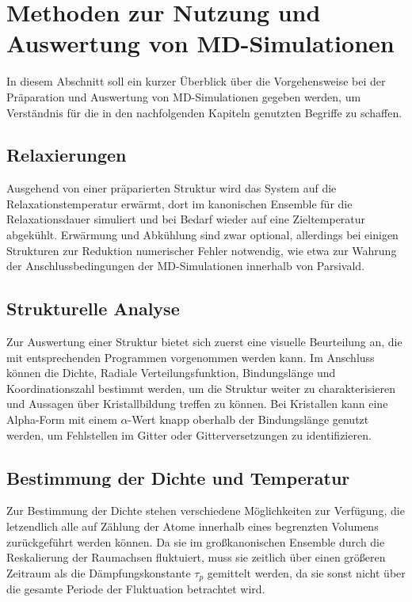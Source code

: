 \section{Methoden zur Nutzung und Auswertung von MD-Simulationen}


In diesem Abschnitt soll ein kurzer Überblick über die Vorgehensweise bei der Präparation und Auswertung von MD-Simulationen gegeben werden, um Verständnis für die in den nachfolgenden Kapiteln genutzten Begriffe zu schaffen.

\subsection{Relaxierungen}

Ausgehend von einer präparierten Struktur wird das System auf die Relaxationstemperatur erwärmt, dort im kanonischen Ensemble für die Relaxationsdauer simuliert und bei Bedarf wieder auf eine Zieltemperatur abgekühlt.
Erwärmung und Abkühlung sind zwar optional, allerdings bei einigen Strukturen zur Reduktion numerischer Fehler notwendig, wie etwa zur Wahrung der Anschlussbedingungen der MD-Simulationen innerhalb von Parsivald.

\subsection{Strukturelle Analyse}

Zur Auswertung einer Struktur bietet sich zuerst eine visuelle Beurteilung an, die mit entsprechenden Programmen vorgenommen werden kann.
Im Anschluss können die Dichte, Radiale Verteilungsfunktion, Bindungslänge und Koordinationszahl bestimmt werden, um die Struktur weiter zu charakterisieren und Aussagen über Kristallbildung treffen zu können.
Bei Kristallen kann eine Alpha-Form mit einem $\alpha$-Wert knapp oberhalb der Bindungslänge genutzt werden, um Fehlstellen im Gitter oder Gitterversetzungen zu identifizieren.

\subsection{Bestimmung der Dichte und Temperatur}

Zur Bestimmung der Dichte stehen verschiedene Möglichkeiten zur Verfügung, die letzendlich alle auf Zählung der Atome innerhalb eines begrenzten Volumens zurückgeführt werden können.
Da sie im großkanonischen Ensemble durch die Reskalierung der Raumachsen fluktuiert, muss sie zeitlich über einen größeren Zeitraum als die Dämpfungskonstante $\tau_p$ gemittelt werden, da sie sonst nicht über die gesamte Periode der Fluktuation betrachtet wird.

